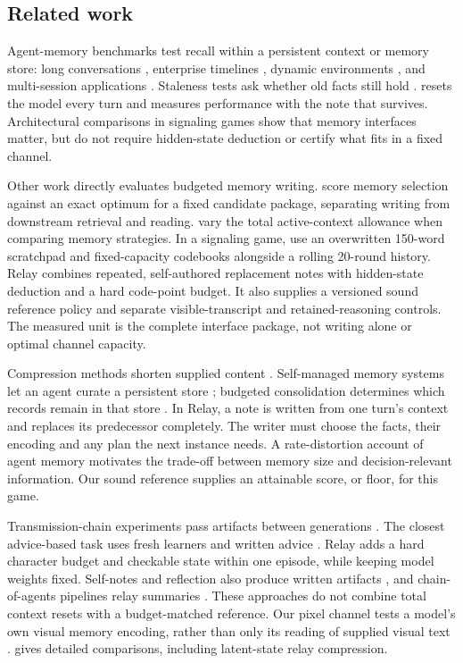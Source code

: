 \subsection{Related work}\label{sec:related}

Agent-memory benchmarks test recall within a persistent context or memory store: long conversations \citep{locomo2024}, enterprise timelines \citep{memtrack2025}, dynamic environments \citep{gaia226,evoarena2026}, and multi-session applications \citep{memoryarena2026,memgym2026}. Staleness tests ask whether old facts still hold \citep{stale2026}. \relay{} resets the model every turn and measures performance with the note that survives. Architectural comparisons in signaling games \citep{signals2026} show that memory interfaces matter, but do not require hidden-state deduction or certify what fits in a fixed channel.

Other work directly evaluates budgeted memory writing. \citet{memaudit2026} score memory selection against an exact optimum for a fixed candidate package, separating writing from downstream retrieval and reading. \citet{budgetbench2026} vary the total active-context allowance when comparing memory strategies. In a signaling game, \citet{signals2026} use an overwritten 150-word scratchpad and fixed-capacity codebooks alongside a rolling 20-round history. Relay combines repeated, self-authored replacement notes with hidden-state deduction and a hard code-point budget. It also supplies a versioned sound reference policy and separate visible-transcript and retained-reasoning controls. The measured unit is the complete interface package, not writing alone or optimal channel capacity.

Compression methods shorten supplied content \citep{llmlingua2023,gist2023,autocompressors2023,icae2023,raptor2024}. Self-managed memory systems let an agent curate a persistent store \citep{memgpt2023,generativeagents2023,latentctx2026}; budgeted consolidation determines which records remain in that store \citep{retainconsolidate2026}. In Relay, a note is written from one turn's context and replaces its predecessor completely. The writer must choose the facts, their encoding and any plan the next instance needs. A rate-distortion account of agent memory \citep{ratedistortion2026} motivates the trade-off between memory size and decision-relevant information. Our sound reference supplies an attainable score, or floor, for this game.

Transmission-chain experiments pass artifacts between generations \citep{kirby2001,kirby2008,acerbi2023}. The closest advice-based task uses fresh learners and written advice \citep{colas2025}. Relay adds a hard character budget and checkable state within one episode, while keeping model weights fixed. Self-notes and reflection also produce written artifacts \citep{selfnotes2023,reflexion2023,expel2023}, and chain-of-agents pipelines relay summaries \citep{chainofagents2024}. These approaches do not combine total context resets with a budget-matched reference. Our pixel channel tests a model's own visual memory encoding, rather than only its reading of supplied visual text \citep{vistabench2026,visionwormhole2026}.  gives detailed comparisons, including latent-state relay compression.
